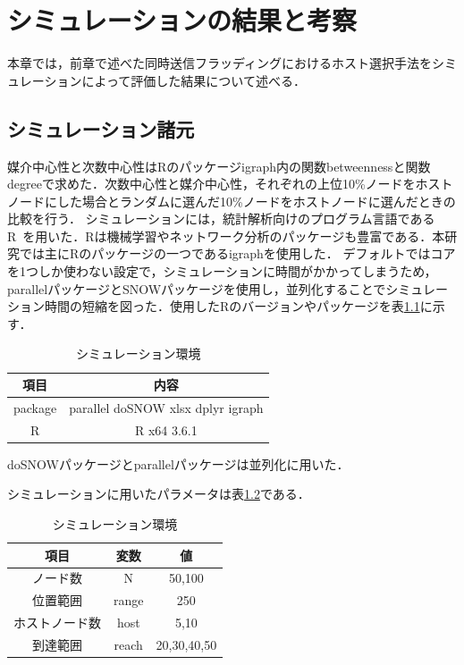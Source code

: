 \chapter{シミュレーションの結果と考察}

本章では，前章で述べた同時送信フラッディングにおけるホスト選択手法をシミュレーションによって評価した結果について述べる．

\section{シミュレーション諸元}
媒介中心性と次数中心性はRのパッケージigraph内の関数betweennessと関数degreeで求めた．次数中心性と媒介中心性，それぞれの上位10\%ノードをホストノードにした場合とランダムに選んだ10\%ノードをホストノードに選んだときの比較を行う．
シミュレーションには，統計解析向けのプログラム言語であるR~\cite{R}を用いた．Rは機械学習やネットワーク分析のパッケージも豊富である．本研究では主にRのパッケージの一つであるigraphを使用した．
デフォルトではコアを1つしか使わない設定で，シミュレーションに時間がかかってしまうため，parallelパッケージとSNOWパッケージを使用し，並列化することでシミュレーション時間の短縮を図った．使用したRのバージョンやパッケージを表\ref{tab:sim_info}に示す．

\begin{table}[H]
\centering
  \caption{シミュレーション環境}
  \begin{tabular}{c|c} \hline\hline
    項目 & 内容  \\ \hline 
    package& parallel doSNOW  xlsx dplyr igraph\\
    R & R x64 3.6.1\\\hline\hline
  \end{tabular}
  \label{tab:sim_info}
\end{table}
doSNOWパッケージとparallelパッケージは並列化に用いた．

シミュレーションに用いたパラメータは表\ref{tab:para_info}である．
\begin{table}[H]
\centering
  \caption{シミュレーション環境}
  \begin{tabular}{c|c|c} \hline\hline 
    項目 & 変数& 値  \\ \hline 
    ノード数& N & 50,100\\
    位置範囲& range & 250\\
    ホストノード数& host & 5,10\\
    到達範囲 & reach &20,30,40,50\\\hline\hline
  \end{tabular}
  \label{tab:para_info}
\end{table}

